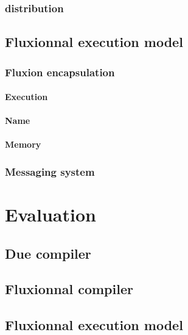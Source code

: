 \documentclass[12pt]{report}
\begin{document}
    \subsection{distribution}

  \section{Fluxionnal execution model}
    \subsection{Fluxion encapsulation}
      \subsubsection{Execution}
      \subsubsection{Name}
      \subsubsection{Memory}
    \subsection{Messaging system}

\chapter{Evaluation}
  \section{Due compiler}
  \section{Fluxionnal compiler}
  \section{Fluxionnal execution model}




\printbibliography[]
\end{document}
